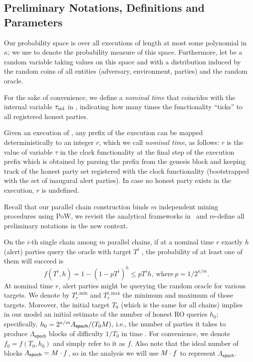 \subsection{Preliminary Notations, Definitions and Parameters}
\label{subsec:preliminary-notations-and-definitions}

Our probability space is over all executions of length at most some polynomial in $\kappa$; we use \Pr to denote the probability measure of this space.
%
Furthermore, let \E be a random variable taking values on this space and with a distribution induced by the random coins of all entities (adversary, environment, parties) and the random oracle.

For the sake of convenience, we define a \emph{nominal time} that coincides with the internal variable $\tau_\mathrm{sid}$ in \funcDriftingClock, indicating how many times the functionality ``ticks'' to all registered honest parties.

\begin{definition}
    Given an execution of \pSMR, any prefix of the execution can be mapped deterministically to an integer $r$, which we call \emph{nominal time}, as follows: $r$ is the value of variable $\tau$ in the clock functionality at the final step of the execution prefix which is obtained by parsing the prefix from the genesis block and keeping track of the honest party set registered with the clock functionality (bootstrapped with the set of inaugural alert parties).
    In case no honest party exists in the execution, $r$ is undefined.
\end{definition}

Recall that our parallel chain construction binds $m$ independent mining procedures using \mforone PoW, we revisit the analytical frameworks in~\cite{C:GarKiaLeo17,EPRINT:GarKiaLeo20} and re-define all preliminary notations in the new context.

On the $i$-th single chain among $m$ parallel chains, if at a nominal time $r$ exactly $h$ (alert) parties query the oracle with target $T^i$ , the probability of at least one of them will succeed is
%
\[ f(T^i, h) = 1 - (1 - p T^i)^h \le p T^i h, ~\text{where}~ p = 1 / 2^{\kappa / m}. \]
%
At nominal time $r$, alert parties might be querying the random oracle for various targets.
%
We denote by $T^{i, \mathrm{min}}_r$ and $T^{i, \mathrm{max}}_r$ the minimum and maximum of those targets.
%
Moreover, the initial target $T_0$ (which is the same for all chains) implies in our model an initial estimate of the number of honest RO queries $h_0$; specifically, $h_0 = 2^{\kappa / m} \varLambda_{\mathsf{epoch}} / (T_0 M)$, i.e., the number of parties it takes to produce $\varLambda_{\mathsf{epoch}}$ blocks of difficulty $1 / T_0$ in time \epochLen.
%
For convenience, we denote $f_0 = f (T_0, h_0)$ and simply refer to it as $f$. %
%
Also note that the ideal number of blocks $\varLambda_{\mathsf{epoch}} = M \cdot f$, so in the analysis we will use $M \cdot f$ to represent $\varLambda_{\mathsf{epoch}}$.

